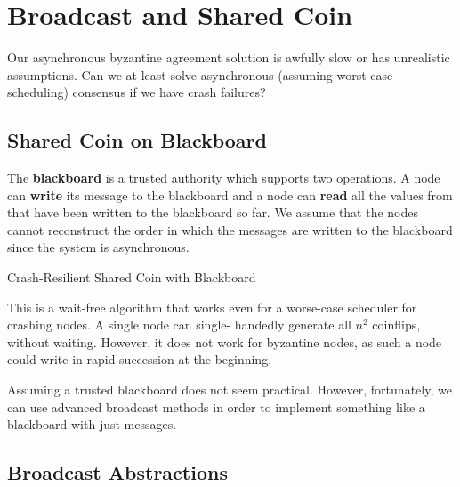 \section{Broadcast and Shared Coin}

Our asynchronous byzantine agreement solution is awfully slow or has unrealistic assumptions. Can we at least solve asynchronous (assuming worst-case scheduling) consensus if we have crash failures?


\subsection{Shared Coin on Blackboard}

The \textbf{blackboard} is a trusted authority which supports two operations. A node can \textbf{write} its message to the blackboard and a node can \textbf{read} all the values from that have been written to the blackboard so far. We assume that the nodes cannot reconstruct the order in which the messages are written to the blackboard since the system is asynchronous. \medskip

\begin{algorithm}[H]
\caption{Crash-Resilient Shared Coin with Blackboard}
\end{algorithm}
\medskip

This is a wait-free algorithm that works even for a worse-case scheduler for crashing nodes. A single node can single- handedly generate all $n^2$ coinflips, without waiting. However, it does not work for byzantine nodes, as such a node could write in rapid succession at the beginning. \medskip

Assuming a trusted blackboard does not seem practical. However, fortunately, we can use advanced broadcast methods in order to implement something like a blackboard with just messages.


\subsection{Broadcast Abstractions}

